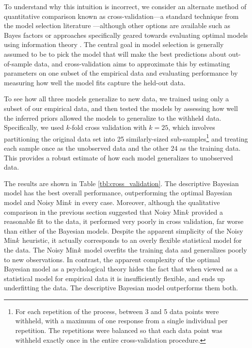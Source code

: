 \documentclass[doc,floatsintext]{apa6}
\newcommand{\mink}{{Min\textit{k}\ }}
\begin{document}
To understand why this intuition is incorrect, we consider an alternate method of quantitative comparison known as cross-validation---a standard technique from the model selection literature \cite{browne_cross-validation_2000}---although other options are available such as Bayes factors \cite{wasserman2000bayesian} or approaches specifically geared towards evaluating optimal models using information theory \cite{shen2016}. The central goal in model selection is generally assumed to be to pick the model that will make the best predictions about out-of-sample data, and cross-validation aims to approximate this by estimating parameters on one subset of the empirical data and evaluating performance by measuring how well the model fits capture the held-out data.

To see how all three models generalize to new data, we trained using only a subset of our empirical data, and then tested the models by assessing how well the inferred priors allowed the models to generalize to the withheld data. Specifically, we used $k$-fold cross validation with $k=25$, which involves partitioning the original data set into 25 similarly-sized sub-samples\footnote{For each repetition of the process, between 3 and 5 data points were withheld, with a maximum of one response from a single individual per repetition. The repetitions were balanced so that each data point was withheld exactly once in the entire cross-validation procedure.} and treating each sample once as the unobserved data and the other 24 as the training data. This provides a robust estimate of how each model generalizes to unobserved data.

The results are shown in Table \ref{tbl:cross_validation}. The descriptive Bayesian model has the best overall performance, outperforming the optimal Bayesian model and Noisy \mink in every case. Moreover, although the qualitative comparison in the previous section suggested that Noisy \mink provided a reasonable fit to the data, it performed very poorly in cross validation, far worse than either of the Bayesian models. Despite the apparent simplicity of the Noisy \mink heuristic, it actually corresponds to an overly flexible statistical model for the data. The Noisy \mink model overfits the training data and generalizes poorly to new observations. In contrast, the apparent complexity of the optimal Bayesian model as a psychological theory hides the fact that when viewed as a statistical model for empirical data it is insufficiently flexible, and ends up underfitting the data. The descriptive Bayesian model outperforms them both.
\end{document}
